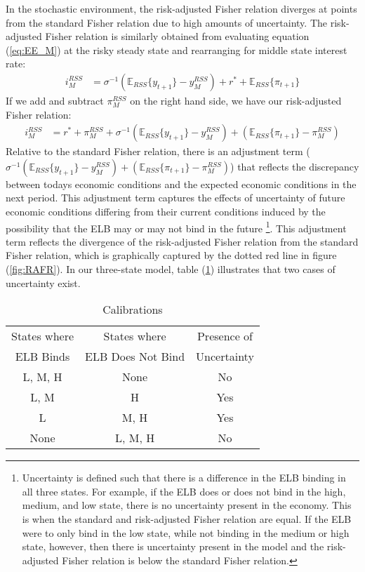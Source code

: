 \documentclass[11pt]{article}
\begin{document}
	In the stochastic environment, the risk-adjusted Fisher relation diverges at points from the standard Fisher relation due to high amounts of uncertainty. The risk-adjusted Fisher relation is similarly obtained from evaluating equation (\ref{eq:EE_M}) at the risky steady state and rearranging for middle state interest rate: 
	\begin{align*}
		i_M^{RSS} &= \sigma^{-1}\left(\mathbb{E}_{RSS}\{y_{t+1}\} - y_M^{RSS}\right) + r^* + \mathbb{E}_{RSS}\{\pi_{t+1}\} 
	\end{align*}
	If we add and subtract $\pi_M^{RSS}$ on the right hand side, we have our risk-adjusted Fisher relation:
	\begin{align}
		i_M^{RSS} &= r^* + \pi_M^{RSS} + \sigma^{-1}\left(\mathbb{E}_{RSS}\{y_{t+1}\} - y_M^{RSS}\right) + \left(\mathbb{E}_{RSS}\{\pi_{t+1}\} - \pi_M^{RSS}\right) \label{eq:RAFR}
	\end{align}
	Relative to the standard Fisher relation, there is an adjustment term ($\sigma^{-1}\left(\mathbb{E}_{RSS}\{y_{t+1}\} - y_M^{RSS}\right) + \left(\mathbb{E}_{RSS}\{\pi_{t+1}\} - \pi_M^{RSS}\right) $) that reflects the discrepancy between todays economic conditions and the expected economic conditions in the next period. This adjustment term captures the effects of uncertainty of future economic conditions differing from their current conditions induced by the possibility that the ELB may or may not bind in the future \footnote{Uncertainty is defined such that there is a difference in the ELB binding in all three states. For example, if the ELB does or does not bind in the high, medium, and low state, there is no uncertainty present in the economy. This is when the standard and risk-adjusted Fisher relation are equal. If the ELB were to only bind in the low state, while not binding in the medium or high state, however, then there is uncertainty present in the model and the risk-adjusted Fisher relation is below the standard Fisher relation.}. This adjustment term reflects the divergence of the risk-adjusted Fisher relation from the standard Fisher relation, which is graphically captured by the dotted red line in figure (\ref{fig:RAFR}). In our three-state model, table (\ref{t:Uncertainty}) illustrates that two cases of uncertainty exist. 
	
	\begin{table}
		\centering
		\begin{tabular}{ccc}
			\hline
			\hline
			States where & States where  & Presence of \\
			ELB Binds & ELB Does Not Bind & Uncertainty\\
			\hline
			L, M, H & None & No\\
			L, M & H & Yes \\
			L & M, H & Yes \\
			None & L, M, H & No\\
			\hline
			\hline
		\end{tabular}
		\caption{Calibrations}
		\label{t:Uncertainty}
	\end{table}
	
\end{document}
